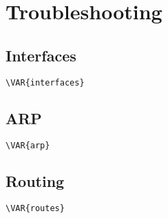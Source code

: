 \documentclass[a4paper]{article}
\begin{document}
\clearpage

\section{Troubleshooting}


\begin{center}
\end{center}



\subsection{Interfaces}


\begin{lstlisting}[language=Bash, caption=ip address show]
\VAR{interfaces}
\end{lstlisting}

\subsection{ARP}


\begin{lstlisting}[language=Bash, caption=ip neigh show]
\VAR{arp}
\end{lstlisting}


\subsection{Routing}


\begin{lstlisting}[language=Bash, caption=ip route list]
\VAR{routes}
\end{lstlisting}
\end{document}

